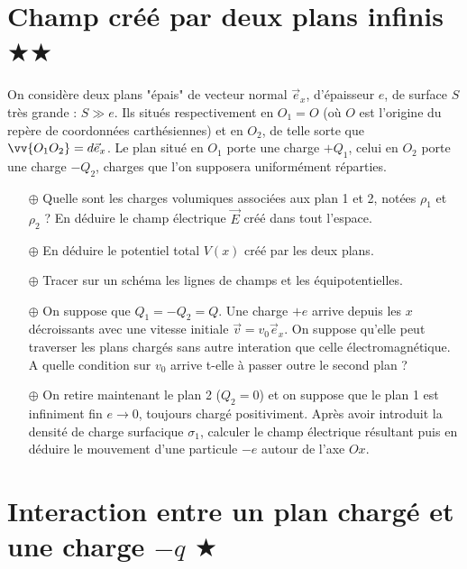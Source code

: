 \documentclass{report}
\begin{document}
\section*{Champ créé par deux plans infinis $\bigstar\bigstar$}

On considère deux plans "épais" de vecteur normal $\vec{e}_x$, d'épaisseur $e$, de surface $S$ très grande : $S\gg e$. Ils situés respectivement en $O_1=O$ (où $O$ est l'origine du repère de coordonnées carthésiennes) et en $O_2$, de telle sorte que $\vv{O_1O_2}=d\vec{e}_x$. Le plan situé en $O_1$ porte une charge $+Q_1$, celui en $O_2$ porte une charge $-Q_2$, charges que l'on supposera uniformément réparties. 

\begin{itemize}

	\item[$\oplus$] Quelle sont les charges volumiques associées aux plan 1 et 2, notées $\rho_1$ et $\rho_2$ ? En déduire le champ électrique $\vec{E}$ créé dans tout l'espace.

	\item[$\oplus$] En déduire le potentiel total $V(x)$ créé par les deux plans.
	
	\item[$\oplus$] Tracer sur un schéma les lignes de champs et les équipotentielles. 
	
	\item[$\oplus$] On suppose que $Q_1=-Q_2=Q$. Une charge $+e$ arrive depuis les $x$ décroissants avec une vitesse initiale $\vec{v}=v_0\vec{e}_x$. On suppose qu'elle peut traverser les plans chargés sans autre interation que celle électromagnétique. A quelle condition sur $v_0$ arrive t-elle à passer outre le second plan ? 
	
	\item[$\oplus$] On retire maintenant le plan 2 ($Q_2=0$) et on suppose que le plan 1 est infiniment fin $e\longrightarrow0$, toujours chargé positiviment. Après avoir introduit la densité de charge surfacique $\sigma_1$, calculer le champ électrique résultant puis en déduire le mouvement d'une particule $-e$ autour de l'axe $Ox$.

\end{itemize}

\newpage

\section*{Interaction entre un plan chargé et une charge $-q$ $\bigstar$}
\end{document}
